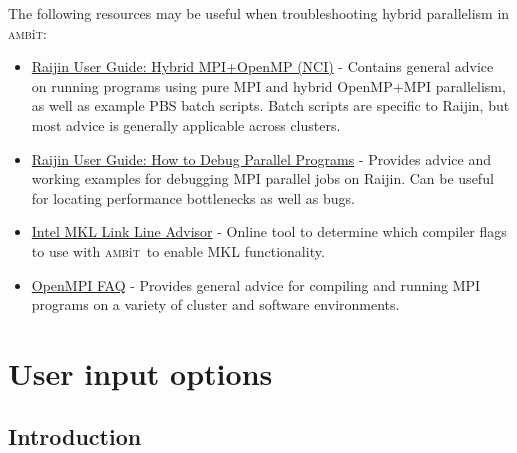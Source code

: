 \documentclass{report}
\newcommand{\ambit}{\textsc{amb}{\footnotesize i}\textsc{t}}
\begin{document}
The following resources may be useful when troubleshooting hybrid parallelism in \ambit:
\begin{itemize}
\item \href{https://opus.nci.org.au/display/Help/Hybrid+MPI+OpenMP}{Raijin User Guide: Hybrid MPI+OpenMP
(NCI)} - Contains general advice on running programs using pure MPI and hybrid OpenMP+MPI parallelism, 
as well as example PBS batch scripts. Batch scripts are specific to Raijin, but most advice is generally
applicable across clusters.

\item \href{https://opus.nci.org.au/display/Help/How+to+Debug+Parallel+Programs}{Raijin User Guide: How
to Debug Parallel Programs} - Provides advice and working examples for debugging MPI parallel jobs on
Raijin. Can be useful for locating performance bottlenecks as well as bugs.

\item \href{https://software.intel.com/en-us/articles/intel-mkl-link-line-advisor/}{Intel MKL Link Line
Advisor} - Online tool to determine which compiler flags to use with \ambit ~to enable MKL functionality.

\item \href{https://www.open-mpi.org/faq/}{OpenMPI FAQ} - Provides general advice for compiling and
running MPI programs on a variety of cluster and software environments.
\end{itemize}

\chapter{User input options}
\label{chap:input}

\section{Introduction}
\end{document}
